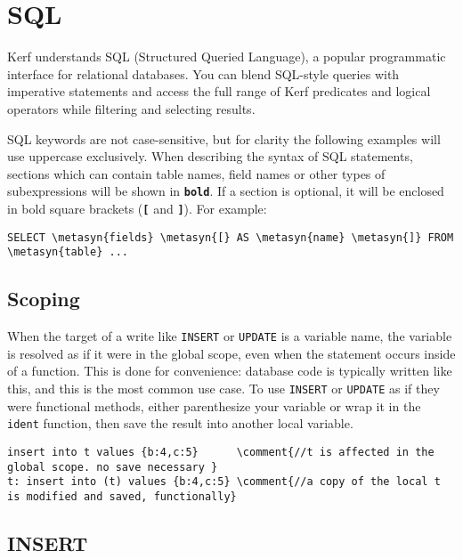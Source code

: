 \documentclass{article}
\newcommand{\comment}[1]{\textcolor{Orange}{#1}}
\newcommand{\metasyn}[1]{\texttt{\textbf{#1}}}
\begin{document}
\pagebreak
\section{SQL}

Kerf understands SQL (Structured Queried Language), a popular programmatic interface for relational databases. You can blend SQL-style queries with imperative statements and access the full range of Kerf predicates and logical operators while filtering and selecting results.

\vspace{0.5cm}

SQL keywords are not case-sensitive, but for clarity the following examples will use uppercase exclusively. When describing the syntax of SQL statements, sections which can contain table names, field names or other types of subexpressions will be shown in \metasyn{bold}. If a section is optional, it will be enclosed in bold square brackets (\metasyn{[} and \metasyn{]}). For example:

\begin{Verbatim}
SELECT \metasyn{fields} \metasyn{[} AS \metasyn{name} \metasyn{]} FROM \metasyn{table} ...
\end{Verbatim}

\subsection{Scoping}
When the target of a write like \texttt{INSERT} or \texttt{UPDATE} is a variable name, the variable is resolved as if it were in the global scope, even when the statement occurs inside of a function. This is done for convenience: database code is typically written like this, and this is the most common use case. To use \texttt{INSERT} or \texttt{UPDATE} as if they were functional methods, either parenthesize your variable or wrap it in the \texttt{ident} function, then save the result into another local variable.

\begin{Verbatim}
insert into t values {b:4,c:5}      \comment{//t is affected in the global scope. no save necessary } 
t: insert into (t) values {b:4,c:5} \comment{//a copy of the local t is modified and saved, functionally} 
\end{Verbatim}

\pagebreak

\subsection{INSERT}
\end{document}
